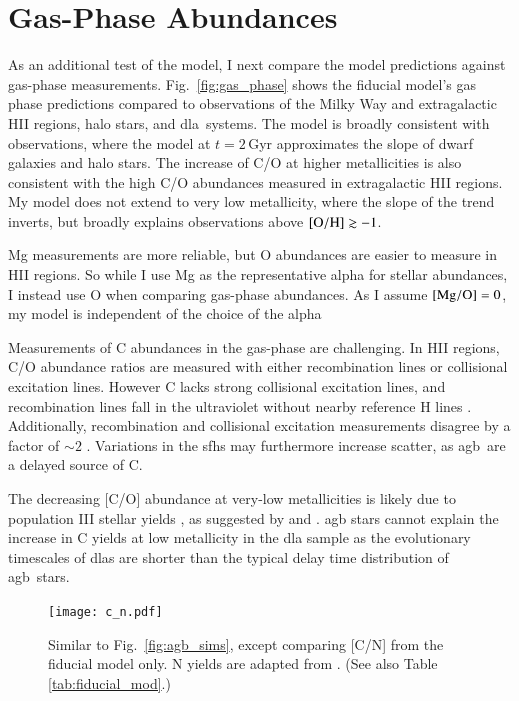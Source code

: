 \documentclass[12pt,oneside,letterpaper]{report}
\newcommand{\agb}{\gls{agb}}
\newcommand{\sfh}{\gls{sfh}}
\newcommand{\dla}{\gls{dla}}
\newcommand{\about}[1]{${\sim} #1$}
\begin{document}
\section{Gas-Phase Abundances}\label{sec:gas}

As an additional test of the model, I next compare the model predictions against gas-phase measurements. Fig.~\ref{fig:gas_phase} shows the fiducial model's gas phase predictions compared to observations of the Milky Way and extragalactic HII regions, halo stars, and \dla\ systems. The model is broadly consistent with observations, where the model at $t=2$\,Gyr approximates the slope of dwarf galaxies and halo stars. The increase of C/O at higher metallicities is also consistent with the high C/O abundances measured in extragalactic HII regions. 
My model does not extend to very low metallicity, where the slope of the trend inverts, but broadly explains observations above $\rm [O/H] \gtrsim -1$. 

Mg measurements are more reliable, but O abundances are easier to measure in HII regions. So while I use Mg as the representative \gls{alpha} for stellar abundances, I instead use O when comparing gas-phase abundances. As I assume ${\rm[Mg/O]}=0$, my model is independent of the choice of the \gls{alpha}

Measurements of C abundances in the gas-phase are challenging. In HII regions, C/O abundance ratios are measured with either recombination lines or collisional excitation lines. However C lacks strong collisional excitation lines, and recombination lines fall in the ultraviolet without nearby reference H lines \citep{skillman+20}. Additionally, recombination and collisional excitation measurements disagree by a factor of \about{2} \citep{GR07}.
Variations in the \sfh{}s may furthermore increase scatter, as \agb\ are a delayed source of C.

The decreasing [C/O] abundance at very-low metallicities is likely due to population III stellar yields \citep[e.g.][]{hirschi07}, as suggested by \citet{cooke+17} and \citet{FN15}. \Gls{agb} stars cannot explain the increase in C yields at low metallicity in the \dla{} sample as the evolutionary timescales of \dla{}s are shorter than the typical delay time distribution of \agb\ stars.

\begin{figure}[htp]
    \centering
    \texttt{[image: c\_n.pdf]}
    \caption[C/N Abundance Agreement]{Similar to Fig.~\ref{fig:agb_sims}, except comparing [C/N] from the fiducial model only. N yields are adapted from \cite{james+23}. (See also Table \ref{tab:fiducial_mod}.)
    }
\end{figure}
\end{document}
